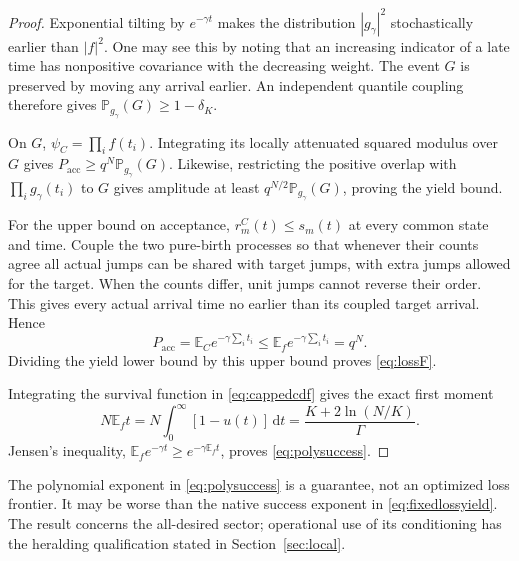 \documentclass[11pt,a4paper]{article}
\newcommand{\E}{\mathbb E}
\newcommand{\Prob}{\mathbb P}
\newcommand{\dd}{\,\mathrm d}
\begin{document}
\begin{proof}
Exponential tilting by \(e^{-\gamma t}\) makes the distribution
\(|g_\gamma|^2\) stochastically earlier than \(|f|^2\). One may
see this by noting that an increasing indicator of a late time
has nonpositive covariance with the decreasing weight.
The event \(G\) is preserved by moving any arrival earlier.
An independent quantile coupling therefore gives
\(\Prob_{g_\gamma}(G)\ge1-\delta_K\).

On \(G\), \(\psi_C=\prod_i f(t_i)\). Integrating its locally
attenuated squared modulus over \(G\) gives
\(P_{\mathrm{acc}}\ge q^N\Prob_{g_\gamma}(G)\).
Likewise, restricting the positive overlap with
\(\prod_i g_\gamma(t_i)\) to \(G\) gives amplitude at least
\(q^{N/2}\Prob_{g_\gamma}(G)\), proving the yield bound.

For the upper bound on acceptance, \(r_m^C(t)\le s_m(t)\) at
every common state and time. Couple the two pure-birth processes
so that whenever their counts agree all actual jumps can be
shared with target jumps, with extra jumps allowed for the
target. When the counts differ, unit jumps cannot reverse their
order. This gives every actual arrival time no earlier than
its coupled target arrival. Hence
\begin{equation}
 P_{\mathrm{acc}}=\E_C e^{-\gamma\sum_i t_i}
 \le\E_f e^{-\gamma\sum_i t_i}=q^N .
\end{equation}
Dividing the yield lower bound by this upper bound proves
\eqref{eq:lossF}.

Integrating the survival function in \eqref{eq:cappedcdf} gives
the exact first moment
\begin{equation}
 N\E_f t
 =N\int_0^\infty[1-u(t)]\dd t
 =\frac{K+2\ln(N/K)}{\Gamma}.
 \label{eq:firstmoment}
\end{equation}
Jensen's inequality,
\(\E_f e^{-\gamma t}\ge e^{-\gamma\E_f t}\),
proves \eqref{eq:polysuccess}.
\end{proof}

The polynomial exponent in \eqref{eq:polysuccess} is a guarantee,
not an optimized loss frontier. It may be worse than the native
success exponent in \eqref{eq:fixedlossyield}. The result concerns
the all-desired sector; operational use of its conditioning has
the heralding qualification stated in Section~\ref{sec:local}.
\end{document}
